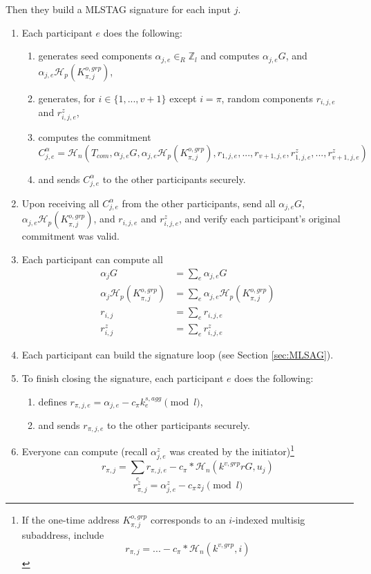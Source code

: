 Then they build a MLSTAG signature for each input $j$.
\begin{enumerate}
    \item Each participant $e$ does the following:
    \begin{enumerate}
        \item generates seed components $\alpha_{j,e} \in_R \mathbb{Z}_l$ and computes $\alpha_{j,e} G$, and $\alpha_{j,e} \mathcal{H}_p(K^{o,grp}_{\pi,j})$,
        \item generates, for $i \in \{1,...,v+1\}$ except $i = \pi$, random components $r_{i,j,e}$ and $r^z_{i,j,e}$,
        \item computes the commitment
        \[C^{\alpha}_{j,e} = \mathcal{H}_n(T_{com},\alpha_{j,e} G, \alpha_{j,e} \mathcal{H}_p(K^{o,grp}_{\pi,j}),r_{1,j,e},...,r_{v+1,j,e},r^z_{1,j,e},...,r^z_{v+1,j,e})\]
        \item and sends $C^{\alpha}_{j,e}$ to the other participants securely.
    \end{enumerate}
    \item Upon receiving all $C^{\alpha}_{j,e}$ from the other participants, send all $\alpha_{j,e} G$, $\alpha_{j,e} \mathcal{H}_p(K^{o,grp}_{\pi,j})$, and $r_{i,j,e}$ and $r^z_{i,j,e}$, and verify each participant's original commitment was valid.
    \item Each participant can compute all
    \begin{align*}
        \alpha_{j} G &= \sum_e \alpha_{j,e} G\\
        \alpha_{j} \mathcal{H}_p(K^{o,grp}_{\pi,j}) &= \sum_e \alpha_{j,e} \mathcal{H}_p(K^{o,grp}_{\pi,j})\\
        r_{i,j} &= \sum_e r_{i,j,e}\\
        r^{z}_{i,j} &= \sum_e r^z_{i,j,e}
    \end{align*}{}
    \item Each participant can build the signature loop (see Section \ref{sec:MLSAG}).
    \item To finish closing the signature, each participant $e$ does the following:
    \begin{enumerate}
        \item defines $r_{\pi,j,e} = \alpha_{j,e} - c_{\pi} k^{s,agg}_e \pmod l$,
        \item and sends $r_{\pi,j,e}$ to the other participants securely.
    \end{enumerate}
    \item Everyone can compute (recall $\alpha^z_{j,e}$ was created by the initiator)\footnote{If the one-time address $K^{o,grp}_{\pi,j}$ corresponds to an $i$-indexed multisig subaddress, include
    \[r_{\pi,j} = ... - c_{\pi}*\mathcal{H}_n(k^{v,grp},i)\]}\vspace{.175cm}
    \[r_{\pi,j} = \sum_e r_{\pi,j,e} - c_{\pi}*\mathcal{H}_n(k^{v,grp} r G, u_j)\]
    \[r^{z}_{\pi,j} = \alpha^z_{j,e} - c_{\pi} z_j \pmod l\]
\end{enumerate}

